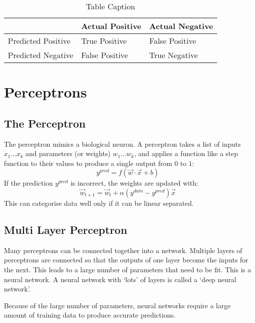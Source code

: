 \begin{table}[htbp]
    \centering
    \begin{tabular}{lll}
        \toprule
                           & Actual Positive & Actual Negative \\
        \midrule
        Predicted Positive & True Positive   & False Positive  \\
        Predicted Negative & False Positive  & True Negative   \\
        \bottomrule
    \end{tabular}
    \caption{Table Caption}
    \label{tab:label}
\end{table}

\section{Perceptrons}
\subsection{The Perceptron}
The perceptron mimics a biological neuron. A perceptron takes a list of inputs \(x_1 \dots x_k\) and parameters (or weights) \(w_1 \dots w_k\), and applies a function like a step function to their values to produce a single output from \(0\) to \(1\):
\begin{equation}
    \label{eq:perceptron_prediction}
    y^{pred} = f(\vec{w} \cdot \vec{x} + b)
\end{equation}
If the prediction \(y^{pred}\) is incorrect, the weights are updated with:
\begin{equation}
    \label{eq:perceptron_updating}
    \vec{w}_{t+1} = \vec{w}_t + \alpha(y^{data} - y^{pred})\vec{x}
\end{equation}
This can categorise data well only if it can be linear separated.

\subsection{Multi Layer Perceptron}
Many perceptrons can be connected together into a network. Multiple layers of perceptrons are connected so that the outputs of one layer become the inputs for the next. This leads to a large number of parameters that need to be fit. This is a neural network. A neural network with `lots' of layers is called a `deep neural network'.

Because of the large number of parameters, neural networks require a large amount of training data to produce accurate predictions.
